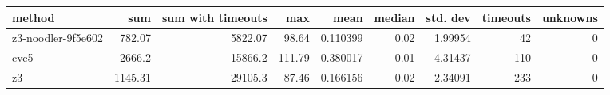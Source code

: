 \begin{tabular}{lrrrrrrrr}
\hline
 method             &     sum &   sum with timeouts &    max &     mean &   median &   std. dev &   timeouts &   unknowns \\
\hline
 z3-noodler-9f5e602 &  782.07 &             5822.07 &  98.64 & 0.110399 &     0.02 &    1.99954 &         42 &          0 \\
 cvc5               & 2666.2  &            15866.2  & 111.79 & 0.380017 &     0.01 &    4.31437 &        110 &          0 \\
 z3                 & 1145.31 &            29105.3  &  87.46 & 0.166156 &     0.02 &    2.34091 &        233 &          0 \\
\hline
\end{tabular}
